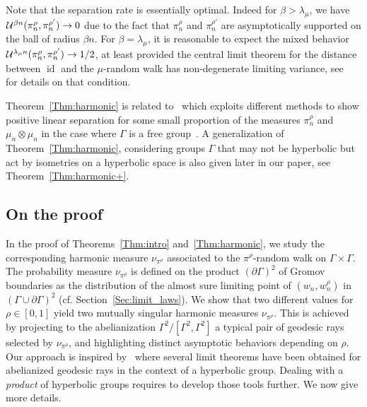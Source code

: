 \documentclass[AHL,Unicode,longabstracts,published]{cedram}
\DeclareMathOperator{\id}{id}
\newcommand{\cU}{\mathcal{U}}
\renewcommand{\(}{\left(}
\renewcommand{\)}{\right)}
\renewcommand*{\to}{\mathchoice{\longrightarrow}{\rightarrow}{\rightarrow}{\rightarrow}}
\begin{document}
Note that the separation rate is essentially optimal. Indeed for $\beta>\lambda_{\mu}$, we have $\cU^{\beta n}(\pi_{n}^\rho, \pi_{n}^{\rho'}) \to 0 $ due to the fact that $\pi_{n}^\rho$ and $\pi_{n}^{\rho'}$ are asymptotically supported on the ball of radius $\beta n$. For $\beta=\lambda_{\mu}$, it is reasonable to expect the mixed behavior $\cU^{\lambda_{\mu} n}(\pi_{n}^\rho, \pi_{n}^{\rho'}) \to 1/2$, at least provided the central limit theorem for the distance between $\id$ and the $\mu$-random walk has non-degenerate limiting variance, see~\cite{BenoistQuintCLThyperbolic} for details on that condition.



Theorem~\ref{Thm:harmonic} is related to~\cite{BenjaminiBrieussel} which exploits different methods to show positive linear separation for some small proportion of the measures $\pi^\rho_n$ and $\mu_n\otimes\mu_n$ in the case where $\Gamma$ is a free group~\cite[Theorem~4.2]{BenjaminiBrieussel}. A generalization of Theorem~\ref{Thm:harmonic}, considering groups $\Gamma$ that may not be hyperbolic but act by isometries on a hyperbolic space is also given later in our paper, see Theorem~\ref{Thm:harmonic+}.


\subsection{On the proof}

In the proof of Theorems~\ref{Thm:intro} and~\ref{Thm:harmonic}, we study the corresponding harmonic measure $\nu_{\pi^\rho}$ associated to the $\pi^\rho$-random walk on $\Gamma \times \Gamma$. The probability measure $\nu_{\pi^\rho}$ is defined on the product $(\partial \Gamma)^2$ of Gromov boundaries as the distribution of the almost sure limiting point of $(w_n, w_n^\rho)$ in $(\Gamma \cup \partial \Gamma)^2$ (cf. Section~\ref{Sec:limit_laws}). We show that two different values for $\rho \in [0, 1]$ yield two mutually singular harmonic measures $\nu_{\pi^\rho}$. This is achieved by projecting to the abelianization $\Gamma^2/[\Gamma^2, \Gamma^2]$ a typical pair of geodesic rays selected by $\nu_{\pi^\rho}$, and highlighting distinct asymptotic behaviors depending on $\rho$. Our approach is inspired by~\cite{BenardWinding} where several limit theorems have been obtained for abelianized geodesic rays in the context of a hyperbolic group. Dealing with a \emph{product} of hyperbolic groups requires to develop those tools further. We now give more details.
\end{document}
